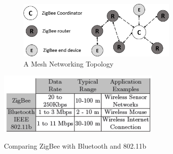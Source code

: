 \begin{figure}[h]
\centering
\includegraphics[width=0.7\textwidth]{Figures/zigbee2}
\caption{A Mesh Networking Topology}
\label{zigbee2}
\end{figure}

\begin{table}[h]
\centering
\includegraphics[width=0.6\textwidth]{Figures/comparison_}
\caption{Comparing ZigBee with Bluetooth and 802.11b}
\label{table:comparison}
\end{table}

